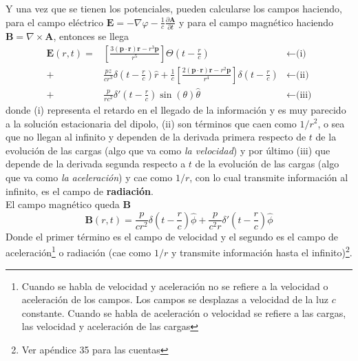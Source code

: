 Y una vez que se tienen los potenciales, pueden calcularse los campos haciendo, para el campo eléctrico $\textbf{E} = -\nabla \varphi - \frac{1}{c}\frac{\partial \textbf{A}}{\partial t}$ y para el campo magnético haciendo $\textbf{B} = \nabla \times \textbf{A}$, entonces se llega 
\begin{align*}
    \textbf{E}(r,t) = &
    \left[
        \frac{3 (\textbf{p}\cdot \textbf{r})\textbf{r} - r^{3}\textbf{p}}{r^{5}}
    \right]
    \Theta 
    \left(
        t - \frac{r}{c}
    \right) & \longleftarrow \mbox{(i)}
    \\
    + &
    \frac{pz}{cr^{3}}\delta
    \left(
        t - \frac{r}{c}
    \right)\hat{r}
    +
    \frac{1}{c}
    \left[
        \frac{2(\textbf{p}\cdot\textbf{r})\textbf{r} - r^{2}\textbf{p}}{r^4}
    \right]
    \delta
    \left(
        t - \frac{r}{c}
    \right) & \longleftarrow \mbox{(ii)}
    \\
    + &
    \frac{p}{rc^{2}}\delta'
    \left(
        t - \frac{r}{c}
    \right)
    \sin{(\theta)}\hat{\theta} & \longleftarrow \mbox{(iii)}
\end{align*}
donde (i) representa el retardo en el llegado de la información y es muy parecido a la solución estacionaria del dipolo, (ii) son términos que caen como $1/r^{2}$, o sea que no llegan al infinito y dependen de la derivada primera respecto de $t$ de la evolución de las cargas (algo que va como \textit{la velocidad}) y por último (iii) que depende de la derivada segunda respecto a $t$ de la evolución de las cargas (algo que va como \textit{la aceleración}) y cae como $1/r$, con lo cual transmite información al infinito, es el campo de \textbf{radiación}.\\
\indent El campo magnético queda $\textbf{B}$
\begin{equation*}
    \textbf{B}(r,t) = \frac{p}{cr^{2}}
    \delta
    \left(
        t - \frac{r}{c}
    \right)\hat{\phi} 
    +
    \frac{p}{c^{2}r}\delta'
    \left(
        t - \frac{r}{c}
    \right)\hat{\phi}
\end{equation*}
Donde el primer término es el campo de velocidad y el segundo es el campo de aceleración\footnote{Cuando se habla de velocidad y aceleración no se refiere a la velocidad o aceleración de los campos. Los campos se desplazas a velocidad de la luz $c$ constante. Cuando se habla de aceleración o velocidad se refiere a las cargas, las velocidad y aceleración de las cargas} o radiación (cae como $1/r$ y transmite información hasta el infinito)\footnote{Ver apéndice 35 para las cuentas}.\\
